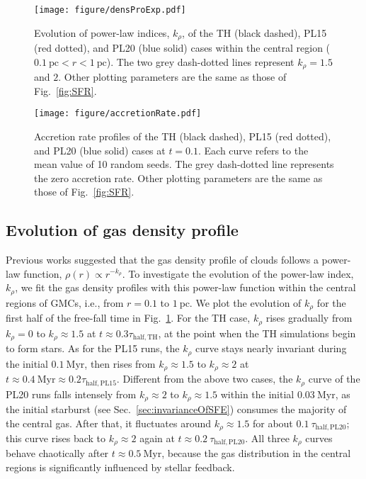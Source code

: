 \documentclass[fleqn,usenatbib]{mnras}
\begin{document}
\begin{figure}
\texttt{[image: figure/densProExp.pdf]}
\caption{Evolution of power-law indices, $k_\rho$, of the TH (black dashed), PL15 (red dotted), and PL20 (blue solid) cases within the central region ($0.1\ \mathrm{pc}<r<1\ \mathrm{pc}$). The two grey dash-dotted lines represent $k_\rho=1.5$ and $2$. Other plotting parameters are the same as those of Fig.~\ref{fig:SFR}.
}
  \label{fig:densProExp}
\end{figure}

\begin{figure}
\texttt{[image: figure/accretionRate.pdf]}
\caption{Accretion rate profiles of the TH (black dashed), PL15 (red dotted), and PL20 (blue solid) cases at $t=0.1$. Each curve refers to the mean value of 10 random seeds. The grey dash-dotted line represents the zero accretion rate. Other plotting parameters are the same as those of Fig.~\ref{fig:SFR}.}
  \label{fig:accretionRate}
\end{figure}

\subsection{Evolution of gas density profile}
\label{sec:evolutionOfGasDensityProfile}

Previous works \citep[e.g.][]{penston_dynamics_1969, pirogov_density_2009, murray_star_2015, donkov_density_2018, li_scale-free_2018} suggested that the gas density profile of clouds follows a power-law function, $\rho(r)\propto r^{-k_\rho}$.
To investigate the evolution of the power-law index, $k_\rho$, we fit the gas density profiles with this power-law function within the central regions of GMCs, i.e., from $r=0.1$ to $1\ \mathrm{pc}$.
We plot the evolution of $k_\rho$ for the first half of the free-fall time in Fig.~\ref{fig:densProExp}.
For the TH case, $k_\rho$ rises gradually from $k_\rho=0$ to $k_\rho\approx 1.5$ at $t\approx 0.3\tau_\mathrm{half,TH}$, at the point when the TH simulations begin to form stars.
As for the PL15 runs, the $k_\rho$ curve stays nearly invariant during the initial $0.1\ \mathrm{Myr}$, then rises from $k_\rho\approx 1.5$ to $k_\rho\approx 2$ at $t\approx 0.4\ \mathrm{Myr}\approx0.2\tau_\mathrm{half,PL15}$.
Different from the above two cases, the $k_\rho$ curve of the PL20 runs falls intensely from $k_\rho\approx 2$ to $k_\rho\approx 1.5$ within the initial $0.03\ \mathrm{Myr}$, as the initial starburst (see Sec.~\ref{sec:invarianceOfSFE}) consumes the majority of the central gas. After that, it fluctuates around $k_\rho\approx 1.5$ for about $0.1\ \tau_\mathrm{half,PL20}$; this curve rises back to $k_\rho\approx 2$ again at $t\approx 0.2\ \tau_\mathrm{half,PL20}$.
All three $k_\rho$ curves behave chaotically after $t\approx0.5\ \mathrm{Myr}$, because the gas distribution in the central regions is significantly influenced by stellar feedback.
\end{document}
